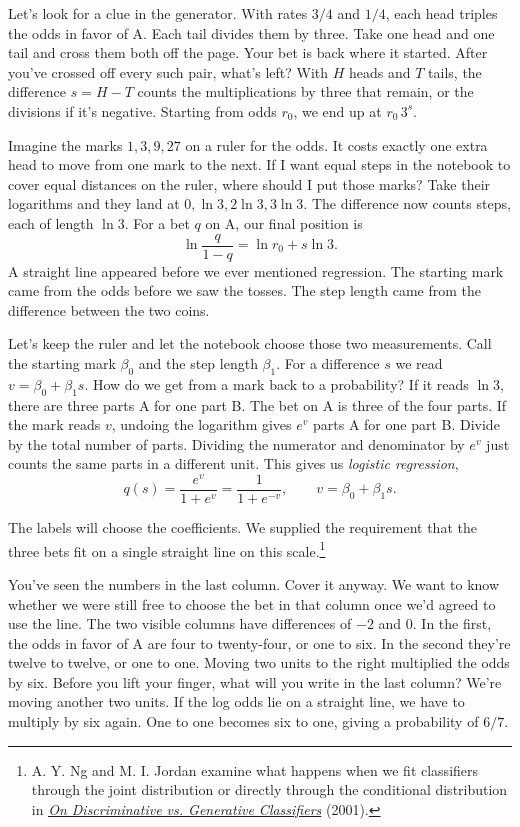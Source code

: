 Let's look for a clue in the generator. With rates $3/4$ and $1/4$, each head triples the odds in favor of A. Each tail divides them by three. Take one head and one tail and cross them both off the page. Your bet is back where it started. After you've crossed off every such pair, what's left? With $H$ heads and $T$ tails, the difference $s=H-T$ counts the multiplications by three that remain, or the divisions if it's negative. Starting from odds $r_0$, we end up at $r_0\,3^s$.

Imagine the marks $1,3,9,27$ on a ruler for the odds. It costs exactly one extra head to move from one mark to the next. If I want equal steps in the notebook to cover equal distances on the ruler, where should I put those marks? Take their logarithms and they land at $0,\ln 3,2\ln 3,3\ln 3$. The difference now counts steps, each of length $\ln 3$. For a bet $q$ on A, our final position is
\[
             \ln\frac{q}{1-q}=\ln r_0+s\ln 3 .
\]
A straight line appeared before we ever mentioned regression. The starting mark came from the odds before we saw the tosses. The step length came from the difference between the two coins.

Let's keep the ruler and let the notebook choose those two measurements. Call the starting mark $\beta_0$ and the step length $\beta_1$. For a difference $s$ we read $v=\beta_0+\beta_1s$. How do we get from a mark back to a probability? If it reads $\ln 3$, there are three parts A for one part B. The bet on A is three of the four parts. If the mark reads $v$, undoing the logarithm gives $e^v$ parts A for one part B. Divide by the total number of parts. Dividing the numerator and denominator by $e^v$ just counts the same parts in a different unit. This gives us \emph{logistic regression},
\[
              q(s)=\frac{e^v}{1+e^v}=\frac{1}{1+e^{-v}},
              \qquad v=\beta_0+\beta_1s .
\]

The labels will choose the coefficients. We supplied the requirement that the three bets fit on a single straight line on this scale.\footnote{A. Y. Ng and M. I. Jordan examine what happens when we fit classifiers through the joint distribution or directly through the conditional distribution in \href{https://proceedings.neurips.cc/paper_files/paper/2001/file/7b7a53e239400a13bd6be6c91c4f6c4e-Paper.pdf}{\emph{On Discriminative vs. Generative Classifiers}} (2001).}

You've seen the numbers in the last column. Cover it anyway. We want to know whether we were still free to choose the bet in that column once we'd agreed to use the line. The two visible columns have differences of $-2$ and $0$. In the first, the odds in favor of A are four to twenty-four, or one to six. In the second they're twelve to twelve, or one to one. Moving two units to the right multiplied the odds by six. Before you lift your finger, what will you write in the last column? We're moving another two units. If the log odds lie on a straight line, we have to multiply by six again. One to one becomes six to one, giving a probability of $6/7$.

